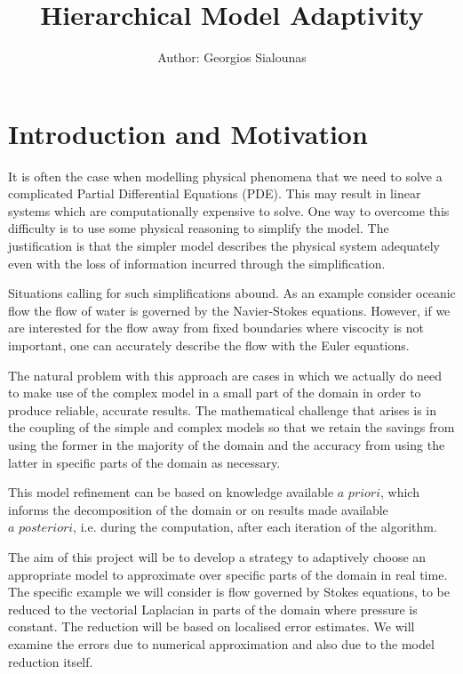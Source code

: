 \documentclass[12pt,a4paper]{article}
\title{Hierarchical Model Adaptivity}
\author{Author: Georgios Sialounas}
\theoremstyle{definition}
\begin{document}
\maketitle
\thispagestyle{empty}
\newpage
\tableofcontents
\thispagestyle{empty}
\newpage
\setcounter{page}{1}


\section{Introduction and Motivation}

It is often the case when modelling physical phenomena that we need to solve a complicated Partial Differential Equations (PDE).  This may result in linear systems which are computationally expensive to solve.  One way to overcome this difficulty is to use some physical reasoning to simplify the model.  The justification is that the simpler model describes the physical system adequately even with the loss of information incurred through the simplification.  

Situations calling for such simplifications abound.  As an example consider oceanic flow the flow of water is governed by the Navier-Stokes equations.  However, if we are interested for the flow away from fixed boundaries where viscocity is not important, one can accurately describe the flow with the Euler equations.

The natural problem with this approach are cases in which we actually do need to make use of the complex model in a small part of the domain in order to produce reliable, accurate results.   The mathematical challenge that arises is in the coupling of the simple and complex models so that we retain the savings from using the former in the majority of the domain and the accuracy from using the latter in specific parts of the domain as necessary.

This model refinement can be based on knowledge available $\textit{a priori}$, which informs the decomposition of the domain or on results made available $\textit{a posteriori}$, i.e. during the computation, after each iteration of the algorithm.

The aim of this project will be to develop a strategy to adaptively choose an appropriate model to approximate over specific parts of the domain in real time.  The specific example we will consider is flow governed by Stokes equations, to be reduced to the vectorial Laplacian in parts of the domain where pressure is constant.  The reduction will be based on localised error estimates.  We will examine the errors due to numerical approximation and also due to the model reduction itself.
\end{document}
